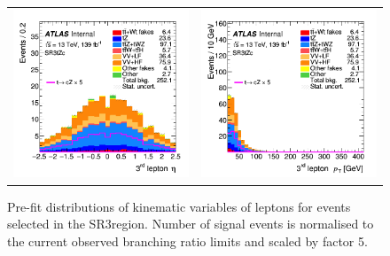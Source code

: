 \begin{figure}[!htbp]
\begin{tabular}{cc}
		\includegraphics[width=.45\textwidth]{Chapters/CH6/figures/SR3_UsingSMT/lep3_eta} &
		\includegraphics[width=.45\textwidth]{Chapters/CH6/figures/SR3_UsingSMT/lep3_pt} \\
	\end{tabular}
	\caption{Pre-fit distributions of kinematic variables of leptons for events selected in the SR3\tZc region.  Number of signal events is normalised to the current observed branching ratio limits and scaled by factor 5. 
		\ErrStatOnly
		\Blinded
	}%
	\label{fig:sr3_kin_lep}
\end{figure}

